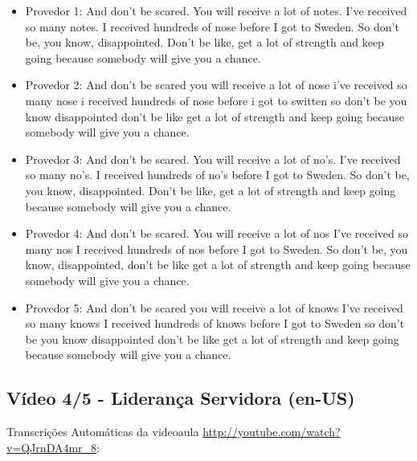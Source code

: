 \begin{itemize}
    \item Provedor 1: And don't be scared. You will receive a lot of notes. I've received so many notes. I received hundreds of nose before I got to Sweden. So don't be, you know, disappointed. Don't be like, get a lot of strength and keep going because somebody will give you a chance.
    \item Provedor 2: And don't be scared you will receive a lot of nose i've received so many nose i received hundreds of nose before i got to switten so don't be you know disappointed don't be like get a lot of strength and keep going because somebody will give you a chance.
    \item Provedor 3: And don't be scared. You will receive a lot of no's. I've received so many no's. I received hundreds of no's before I got to Sweden. So don't be, you know, disappointed. Don't be like, get a lot of strength and keep going because somebody will give you a chance.
    \item Provedor 4: And don't be scared. You will receive a lot of nos I've received so many nos I received hundreds of nos before I got to Sweden. So don't be, you know, disappointed, don't be like get a lot of strength and keep going because somebody will give you a chance.
    \item Provedor 5: And don't be scared you will receive a lot of knows I've received so many knows I received hundreds of knows before I got to Sweden so don't be you know disappointed don't be like get a lot of strength and keep going because somebody will give you a chance.
\end{itemize}

\subsection{Vídeo 4/5 - Liderança Servidora (en-US)}

\noindent
Transcrições Automáticas da videoaula \url{http://youtube.com/watch?v=QJrnDA4mr_8}:

